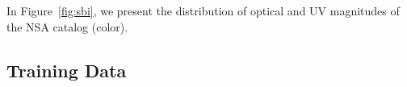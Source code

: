 In Figure~\ref{fig:sbi}, we present the distribution of optical and UV
magnitudes of the NSA catalog (color). 







\subsection{Training Data} \label{sec:train}



